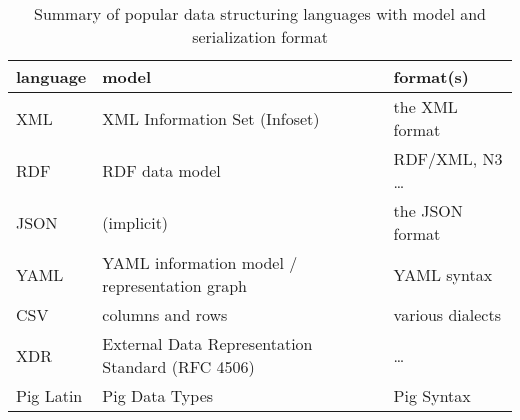 {\begin{table}
\begin{tabular}{|l|l|l|}
\hline
language & model & format(s) \\
\hline
XML & XML Information Set (Infoset) & the XML format \\
RDF & RDF data model %
    & RDF/XML, N3 \ldots \\
JSON & (implicit) & the JSON format \\
YAML & YAML information model / representation graph & YAML syntax \\
CSV & columns and rows & various dialects \\
XDR & External Data Representation Standard (RFC 4506) & \ldots \\
Pig Latin & Pig Data Types & Pig Syntax \\ %
\hline
\end{tabular}
\label{t:dsls}
\caption{Summary of popular data structuring languages with model and
serialization format}
\end{table}


}

\pagebreak
